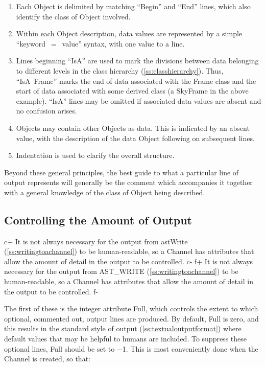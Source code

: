 \documentclass[twoside,11pt]{article}
\newcommand{\appref}[1]{Appendix~\ref{#1}}
\newcommand{\secref}[1]{\S\ref{#1}}
\renewcommand{\appref}[1]{\ref{#1}}
\renewcommand{\secref}[1]{\ref{#1}}
\begin{document}
\begin{enumerate}
\item Each Object is delimited by matching ``Begin'' and ``End''
lines, which also identify the class of Object involved.

\item Within each Object description, data values are represented
by a simple ``keyword~$=$~value'' syntax, with one value to a line.

\item Lines beginning ``IsA'' are used to mark the divisions between
data belonging to different levels in the class hierarchy
(\appref{ss:classhierarchy}). Thus, ``IsA~Frame'' marks the end of data
associated with the Frame class and the start of data associated with
some derived class (a SkyFrame in the above example). ``IsA'' lines
may be omitted if associated data values are absent and no confusion
arises.

\item Objects may contain other Objects as data. This is
indicated by an absent value, with the description of the data
Object following on subsequent lines.

\item Indentation is used to clarify the overall structure.
\end{enumerate}

Beyond these general principles, the best guide to what a particular
line of output represents will generally be the comment which
accompanies it together with a general knowledge of the class of
Object being described.

\subsection{\label{ss:controllingchanneloutput}Controlling the Amount of Output}

c+
It is not always necessary for the output from astWrite
(\secref{ss:writingtoachannel}) to be human-readable, so a Channel has
attributes that allow the amount of detail in the output to be
controlled.
c-
f+
It is not always necessary for the output from AST\_WRITE
(\secref{ss:writingtoachannel}) to be human-readable, so a Channel has
attributes that allow the amount of detail in the output to be
controlled.
f-

The first of these is the integer attribute Full, which controls the
extent to which optional, commented out, output lines are produced. By
default, Full is zero, and this results in the standard style of
output (\secref{ss:textualoutputformat}) where default values that may
be helpful to humans are included. To suppress these optional lines,
Full should be set to $-$1. This is most conveniently done when the
Channel is created, so that:
\end{document}

